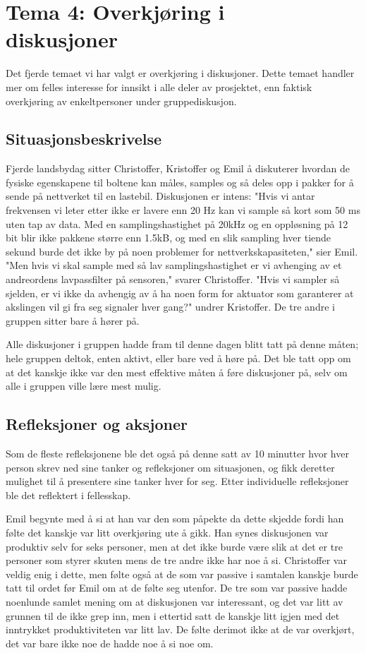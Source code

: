 \chapter{Tema 4: Overkjøring i\\diskusjoner}
Det fjerde temaet vi har valgt er overkjøring i diskusjoner.
Dette temaet handler mer om felles interesse for innsikt i alle deler av
prosjektet, enn faktisk overkjøring av enkeltpersoner under gruppediskusjon.

\section {Situasjonsbeskrivelse}
Fjerde landsbydag sitter Christoffer, Kristoffer og Emil å diskuterer hvordan de fysiske egenskapene til boltene kan måles, samples og så deles opp i pakker for å sende på nettverket til en lastebil. Diskusjonen er intens: "Hvis vi antar frekvensen vi leter etter ikke er lavere enn 20 Hz kan vi sample så kort som 50 ms uten tap av data. Med en samplingshastighet på 20kHz og en oppløsning på 12 bit blir ikke pakkene større enn 1.5kB, og med en slik sampling hver tiende sekund burde det ikke by på noen problemer for nettverkskapasiteten," sier Emil. "Men hvis vi skal sample med så lav samplingshastighet er vi avhenging av et andreordens lavpassfilter på sensoren," svarer Christoffer. "Hvis vi sampler så sjelden, er vi ikke da avhengig av å ha noen form for aktuator som garanterer at akslingen vil gi fra seg signaler hver gang?" undrer Kristoffer. De tre andre i gruppen sitter bare å hører på. 

Alle diskusjoner i gruppen hadde fram til denne dagen blitt tatt på denne måten; hele gruppen deltok, enten aktivt, eller bare ved å høre på. Det ble tatt opp om at det kanskje ikke var den mest effektive måten å føre diskusjoner på, selv om alle i gruppen ville lære mest mulig.

\section{Refleksjoner og aksjoner}
Som de fleste refleksjonene ble det også på denne satt av 10 minutter hvor hver person skrev ned sine tanker og refleksjoner om situasjonen, og fikk deretter mulighet til å presentere sine tanker hver for seg. Etter individuelle refleksjoner ble det reflektert i fellesskap.

Emil begynte med å si at han var den som påpekte da dette skjedde fordi han følte det kanskje var litt overkjøring ute å gikk. Han synes diskusjonen var produktiv selv for seks personer, men at det ikke burde være slik at det er tre personer som styrer skuten mens de tre andre ikke har noe å si. Christoffer var veldig enig i dette, men følte også at de som var passive i samtalen kanskje burde tatt til ordet før Emil om at de følte seg utenfor. De tre som var passive hadde noenlunde samlet mening om at diskusjonen var interessant, og det var litt av grunnen til de ikke grep inn, men i ettertid satt de kanskje litt igjen med det inntrykket produktiviteten var litt lav. De følte derimot ikke at de var overkjørt, det var bare ikke noe de hadde noe å si noe om.

